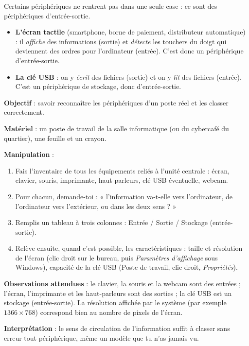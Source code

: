 \documentclass[11pt]{article}
\newcommand{\cle}[1]{{\popxbold\color{popdark}#1}}
\begin{document}
Certains périphériques ne rentrent pas dans une seule case : ce sont des périphériques d'\cle{entrée-sortie}.

\begin{exemplebox}
\begin{itemize}
\item \textbf{L'écran tactile} (smartphone, borne de paiement, distributeur automatique) : il \emph{affiche} des informations (sortie) et \emph{détecte} les touchers du doigt qui deviennent des ordres pour l'ordinateur (entrée). C'est donc un périphérique d'entrée-sortie.
\item \textbf{La clé USB} : on y \emph{écrit} des fichiers (sortie) et on y \emph{lit} des fichiers (entrée). C'est un périphérique de stockage, donc d'entrée-sortie.
\end{itemize}
\end{exemplebox}

\begin{experience}
\textbf{Objectif} : savoir reconnaître les périphériques d'un poste réel et les classer correctement.

\textbf{Matériel} : un poste de travail de la salle informatique (ou du cybercafé du quartier), une feuille et un crayon.

\textbf{Manipulation} :
\begin{enumerate}
\item Fais l'inventaire de tous les équipements reliés à l'unité centrale : écran, clavier, souris, imprimante, haut-parleurs, clé USB éventuelle, webcam.
\item Pour chacun, demande-toi : « l'information va-t-elle vers l'ordinateur, de l'ordinateur vers l'extérieur, ou dans les deux sens ? »
\item Remplis un tableau à trois colonnes : Entrée / Sortie / Stockage (entrée-sortie).
\item Relève ensuite, quand c'est possible, les caractéristiques : taille et résolution de l'écran (clic droit sur le bureau, puis \emph{Paramètres d'affichage} sous Windows), capacité de la clé USB (Poste de travail, clic droit, \emph{Propriétés}).
\end{enumerate}

\textbf{Observations attendues} : le clavier, la souris et la webcam sont des entrées ; l'écran, l'imprimante et les haut-parleurs sont des sorties ; la clé USB est un stockage (entrée-sortie). La résolution affichée par le système (par exemple $1366 \times 768$) correspond bien au nombre de pixels de l'écran.

\textbf{Interprétation} : le sens de circulation de l'information suffit à classer sans erreur tout périphérique, même un modèle que tu n'as jamais vu.
\end{experience}
\end{document}

